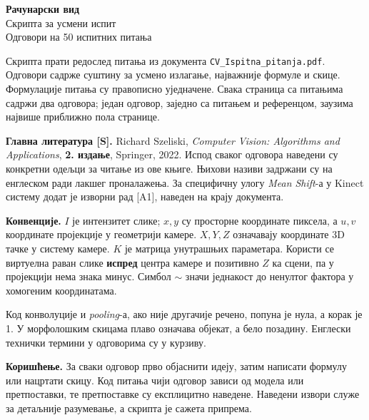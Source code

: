 \documentclass[10pt,a4paper]{article}
\newcommand{\en}[1]{\textit{#1}}
\begin{document}
\begin{center}
{\LARGE\bfseries Рачунарски вид}\\[6pt]
{\Large Скрипта за усмени испит}\\[6pt]
{\large Одговори на 50 испитних питања}
\end{center}
\medskip
Скрипта прати редослед питања из документа \texttt{CV\_Ispitna\_pitanja.pdf}. Одговори садрже суштину за усмено излагање, најважније формуле и скице. Формулације питања су правописно уједначене. Свака страница са питањима садржи два одговора; један одговор, заједно са питањем и референцом, заузима највише приближно пола странице.

\textbf{Главна литература [S].} Richard Szeliski, \en{Computer Vision: Algorithms and Applications}, \textbf{2. издање}, Springer, 2022. Испод сваког одговора наведени су конкретни одељци за читање из ове књиге. Њихови називи задржани су на енглеском ради лакшег проналажења. За специфичну улогу \en{Mean Shift}-а у Kinect систему додат је изворни рад [A1], наведен на крају документа.

\textbf{Конвенције.} $I$ је интензитет слике; $x,y$ су просторне координате пиксела, а $u,v$ координате пројекције у геометрији камере. $X,Y,Z$ означавају координате 3D тачке у систему камере. $K$ је матрица унутрашњих параметара. Користи се виртуелна раван слике \textbf{испред} центра камере и позитивно $Z$ ка сцени, па у пројекцији нема знака минус. Симбол $\sim$ значи једнакост до ненултог фактора у хомогеним координатама.

Код конволуције и \en{pooling}-а, ако није другачије речено, попуна је нула, а корак је 1. У морфолошким скицама плаво означава објекат, а бело позадину. Енглески технички термини у одговорима су у курзиву.

\textbf{Коришћење.} За сваки одговор прво објаснити идеју, затим написати формулу или нацртати скицу. Код питања чији одговор зависи од модела или претпоставки, те претпоставке су експлицитно наведене. Наведени извори служе за детаљније разумевање, а скрипта је сажета припрема.
\end{document}
